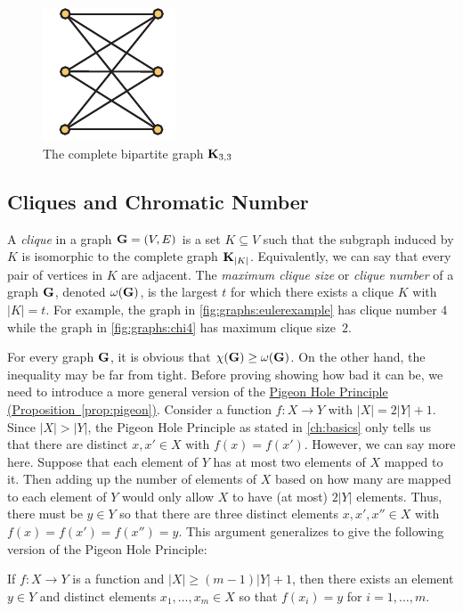 \begin{figure}[h]
  \centering
  \includegraphics[angle=90]{graphs-figs/k33}
  \caption{The complete bipartite graph $\mathbf{K}_{3,3}$}
  \label{fig:graphs:k33}
\end{figure}

\subsection{Cliques and Chromatic Number}

A \textit{clique} in a graph $\mathbf{G}=(V,E)$ is a set $K\subseteq V$ such that
the subgraph induced by $K$ is isomorphic to the complete graph
$\mathbf{K}_{|K|}$. Equivalently, we can say that every pair of vertices in
$K$ are adjacent. The \textit{maximum clique size} or \textit{clique
  number} of a graph $\mathbf{G}$, denoted $\omega(\mathbf{G})$, is the largest
$t$ for which there exists a clique $K$ with $|K|=t$.  For example,
the graph in \autoref{fig:graphs:eulerexample} has clique number $4$
while the graph in \autoref{fig:graphs:chi4} has maximum clique
size~$2$.

For every graph $\mathbf{G}$, it is obvious that $\chi(\mathbf{G})\ge
\omega(\mathbf{G})$.  On the other hand, the inequality may be far from
tight. Before proving showing how bad it can be, we need to introduce
a more general version of the
\hyperref[prop:pigeon]{Pigeon Hole Principle
  (Proposition~\ref*{prop:pigeon})}. Consider a function $f\colon X\to
Y$ with $|X| = 2|Y|+1$. Since $|X|>|Y|$, the Pigeon Hole Principle
as stated in \autoref{ch:basics} only tells us that there are distinct
$x,x'\in X$ with $f(x)=f(x')$. However, we can say more here. Suppose
that each element of $Y$ has at most two elements of $X$ mapped to
it. Then adding up the number of elements of $X$ based on how many are
mapped to each element of $Y$ would only allow $X$ to have (at most)
$2|Y|$ elements. Thus, there must be $y\in Y$ so that there are three
distinct elements $x,x',x''\in X$ with $f(x)=f(x')=f(x'')=y$. This
argument generalizes to give the following version of the Pigeon Hole
Principle:

\begin{proposition}\label{prop:graphs:pigeon-general}
  If $f\colon X\to Y$ is a function and $|X|\geq (m-1)|Y|+1$, then
  there exists an element $y\in Y$ and distinct elements
  $x_1,\dots,x_m \in X$ so that $f(x_i)=y$ for $i=1,\dots,m$.
\end{proposition}

